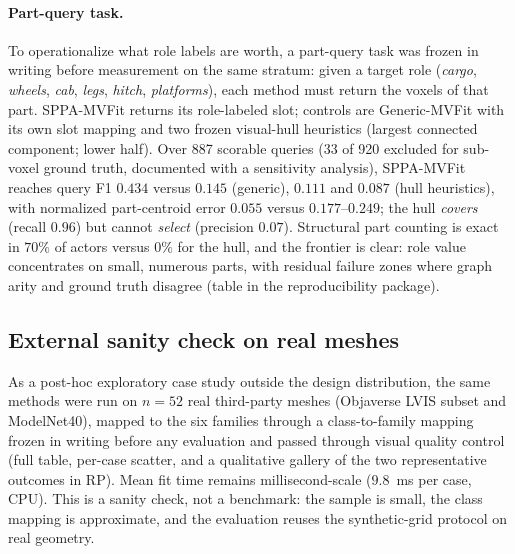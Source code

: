 \documentclass[11pt,a4paper]{article}
\begin{document}
\paragraph{Part-query task.}
To operationalize what role labels are worth, a part-query task was frozen in
writing before measurement on the same stratum: given a target role
(\emph{cargo}, \emph{wheels}, \emph{cab}, \emph{legs}, \emph{hitch},
\emph{platforms}), each method must return the voxels of that part. SPPA-MVFit
returns its role-labeled slot; controls are Generic-MVFit with its own slot
mapping and two frozen visual-hull heuristics (largest connected component;
lower half). Over 887 scorable queries (33 of 920 excluded for sub-voxel
ground truth, documented with a sensitivity analysis), SPPA-MVFit reaches
query F1 \(0.434\) versus \(0.145\) (generic), \(0.111\) and \(0.087\) (hull
heuristics), with normalized part-centroid error \(0.055\) versus
\(0.177\)--\(0.249\); the hull \emph{covers} (recall \(0.96\)) but cannot
\emph{select} (precision \(0.07\)). Structural part counting is exact in
\(70\%\) of actors versus \(0\%\) for the hull, and the frontier is clear:
role value concentrates on small, numerous parts, with residual failure zones
where graph arity and ground truth disagree (table in the reproducibility
package).

\subsection{External sanity check on real meshes}
\label{sec:external-sanity}

As a post-hoc exploratory case study outside the design distribution, the
same methods were run on \(n{=}52\) real third-party meshes (Objaverse LVIS
subset and ModelNet40), mapped to the six families through a class-to-family
mapping frozen in writing before any evaluation and passed through visual
quality control (full table, per-case scatter, and a qualitative gallery of
the two representative outcomes in RP). Mean fit
time remains millisecond-scale (\(9.8\)~ms per case, CPU). This is a sanity
check, not a benchmark: the sample is small, the class mapping is approximate,
and the evaluation reuses the synthetic-grid protocol on real geometry.
\end{document}
